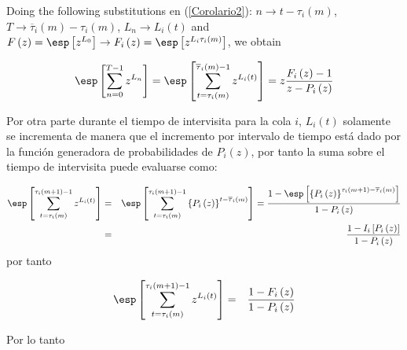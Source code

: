 Doing the following substitutions en (\ref{Corolario2}): $n\rightarrow t-\tau_{i}\left(m\right)$, $T \rightarrow \overline{\tau}_{i}\left(m\right)-\tau_{i}\left(m\right)$, $L_{n}\rightarrow L_{i}\left(t\right)$ and $F\left(z\right)=\esp\left[z^{L_{0}}\right]\rightarrow F_{i}\left(z\right)=\esp\left[z^{L_{i}\tau_{i}\left(m\right)}\right]$, 
we obtain

\begin{eqnarray}\label{Eq.Arribos.Primera}
\esp\left[\sum_{n=0}^{T-1}z^{L_{n}}\right]=
\esp\left[\sum_{t=\tau_{i}\left(m\right)}^{\overline{\tau}_{i}\left(m\right)-1}z^{L_{i}\left(t\right)}\right]
=z\frac{F_{i}\left(z\right)-1}{z-P_{i}\left(z\right)}
\end{eqnarray}



Por otra parte durante el tiempo de intervisita para la cola $i$, $L_{i}\left(t\right)$ solamente se incrementa de manera que el incremento por intervalo de tiempo est\'a dado por la funci\'on generadora de probabilidades de $P_{i}\left(z\right)$, por tanto la suma sobre el tiempo de intervisita puede evaluarse como:

\begin{eqnarray*}
\esp\left[\sum_{t=\tau_{i}\left(m\right)}^{\tau_{i}\left(m+1\right)-1}z^{L_{i}\left(t\right)}\right]&=&\esp\left[\sum_{t=\tau_{i}\left(m\right)}^{\tau_{i}\left(m+1\right)-1}\left\{P_{i}\left(z\right)\right\}^{t-\overline{\tau}_{i}\left(m\right)}\right]=\frac{1-\esp\left[\left\{P_{i}\left(z\right)\right\}^{\tau_{i}\left(m+1\right)-\overline{\tau}_{i}\left(m\right)}\right]}{1-P_{i}\left(z\right)}\\
&=&\frac{1-I_{i}\left[P_{i}\left(z\right)\right]}{1-P_{i}\left(z\right)}
\end{eqnarray*}
por tanto

\begin{eqnarray*}
\esp\left[\sum_{t=\tau_{i}\left(m\right)}^{\tau_{i}\left(m+1\right)-1}z^{L_{i}\left(t\right)}\right]&=&
\frac{1-F_{i}\left(z\right)}{1-P_{i}\left(z\right)}
\end{eqnarray*}

Por lo tanto


